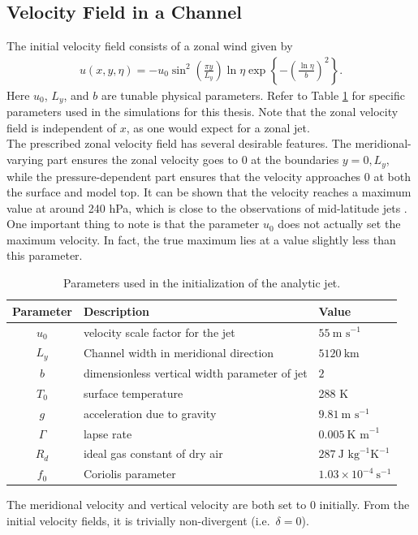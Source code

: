 \subsection{Velocity Field in a Channel}
The initial velocity field consists of a zonal wind given by 
\begin{align}
u(x,y,\eta) = -u_0 \sin^2 { \left(\frac{\pi y}{L_y}\right)} \ln{\eta} \exp{\left\{-\left(\frac{\ln \eta}{b}\right)^2\right\}}.
\end{align}
Here $u_0$, $L_y$, and $b$ are tunable physical parameters. Refer to Table \ref{tab:parameters} for specific parameters used in the simulations for this thesis. Note that the zonal velocity field is independent of $x$, as one would expect for a zonal jet.\\


The prescribed zonal velocity field has several desirable features. The meridional-varying part ensures the zonal velocity goes to 0 at the boundaries $y = 0, L_y$, while the pressure-dependent part ensures that the velocity approaches 0 at both the surface and model top. It can be shown that the velocity reaches a maximum value at around 240 hPa, which is close to the observations of mid-latitude jets \cite{Ullrich2015}. One important thing to note is that the parameter $u_0$ does not actually set the maximum velocity. In fact, the true maximum lies at a value slightly less than this parameter. \\

\begin{table}[H]
\centering
\begin{tabular}{|c|l|l|}
\hline
\textbf{Parameter} & \textbf{Description} & \textbf{Value} \\ \hline
$u_0$ & velocity scale factor for the jet & $55~\text{m s}^{-1}$ \\ \hline
$L_y$ & Channel width in meridional direction & $5120~\text{km}$ \\ \hline
$b$ & dimensionless vertical width parameter of jet & $ 2$ \\ \hline
$T_0$ & surface temperature & 288 K \\ \hline
$g$ & acceleration due to gravity &  $9.81~\text{m s}^{-1}$\\ \hline
$\Gamma$ & lapse rate & $0.005~\text{K m}^{-1}$\\ \hline
$R_d$ & ideal gas constant of dry air & $287 ~\text{J kg}^{-1} \text{K}^{-1}$ \\ \hline
$f_0$ & Coriolis parameter & $ 1.03 \times 10^{-4} ~\text{s}^{-1}$ \\ \hline
\end{tabular}
\caption{Parameters used in the initialization of the analytic jet.}
\label{tab:parameters}
\end{table}
The meridional velocity and vertical velocity are both set to 0 initially. From the initial velocity fields, it is trivially non-divergent (i.e.\ $\delta = 0$).\\

